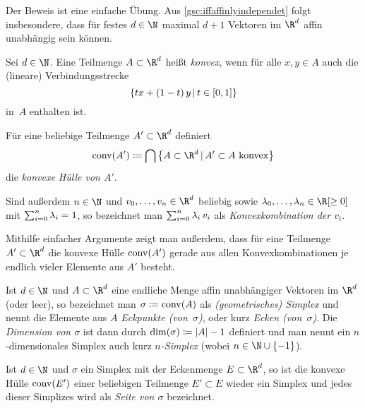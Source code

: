 Der Beweis ist eine einfache Übung.
Aus \cref{gsc:iffaffinlyindependet} folgt insbesondere, dass für festes $d\in\N$
maximal $d+1$ Vektoren im $\R^d$ affin unabhängig sein können.

\begin{thDef}
    Sei $d\in\N$. Eine Teilmenge $A\subset\R^d$ heißt \emph{konvex}, wenn
    für alle $x,y\in A$ auch die (lineare) Verbindungsstrecke
    \[ \{ tx + (1-t)\,y \Mid t\in[0,1] \} \]
    in~$A$ enthalten ist.

    \newpage
    \noindent
    Für eine beliebige Teilmenge $A'\subset\R^d$ definiert
    \[ \conv(A') \defeq 
        \bigcap \,\bigl\{ A\subset\R^d \Mid A'\subset A\text{ konvex} \bigr\}
    \]
    die \emph{konvexe Hülle von $A'$}.
    
    \noindent
    Sind außerdem $n\in\N$ und $v_0,\ldots,v_n\in\R^d$ beliebig sowie
    $\lambda_0,\ldots,\lambda_n\in\R[\geq0]$ mit $\sum_{i=0}^n\lambda_i = 1$, so
    bezeichnet man $\sum_{i=0}^n \lambda_i\,v_i$ als \emph{Konvexkombination der
    $v_i$}.
\end{thDef}

\begin{thBemerkung} \label{gsc:convexhullviaconvexcombinations}
    Mithilfe einfacher Argumente zeigt man außerdem, dass für eine Teilmenge
    $A'\subset\R^d$ die konvexe Hülle $\operatorname{conv}(A')$ gerade aus allen 
    Konvexkombinationen je endlich vieler Elemente aus $A'$ besteht.
\end{thBemerkung}


\begin{thDef}
    \label{gsc:def:simplex}
    Ist $d\in\N$ und $A\subset\R^d$ eine endliche Menge affin unabhängiger
    Vektoren im $\R^d$ (oder leer), so bezeichnet man $\sigma \coloneqq \operatorname{conv}(A)$ als
    \emph{(geometrisches) Simplex} und nennt die Elemente aus $A$
    \emph{Eckpunkte (von~$\sigma$)}, oder kurz \emph{Ecken (von~$\sigma$)}. Die
    \emph{Dimension von $\sigma$} ist dann durch $\dim(\sigma) \coloneqq \lvert A\rvert-1$
    definiert und man nennt ein $n$-dimensionales Simplex auch kurz
    \emph{$n$-Simplex} (wobei $n\in\N\cup\{-1\}$).
\end{thDef}

\begin{thDef}
    Ist $d\in\N$ und $\sigma$ ein Simplex mit der Eckenmenge
    $E \subset\R^d$, so ist die konvexe Hülle $\operatorname{conv}(E')$ einer beliebigen 
    Teilmenge $E'\subset E$ wieder ein Simplex und jedes dieser Simplizes wird
    als \emph{Seite von $\sigma$} bezeichnet.
\end{thDef}


